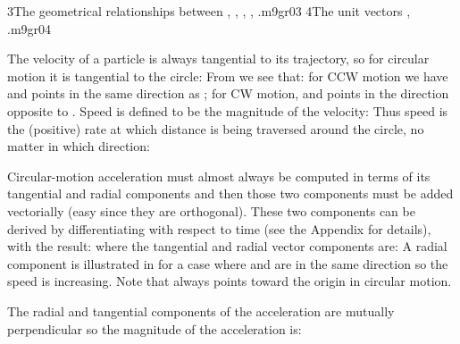 {\TwoCaptionedFramedFigures%
     {3}{The geometrical relationships between , , \m{\theta}, , .}{m9gr03}%
     {4}{The unit vectors , \m{\uvec{\theta}}.}{m9gr04}

The velocity of a particle is always tangential to its trajectory, so for
circular motion it is tangential to the circle:
%
%
From  we see that: for CCW motion we have  and
 points in the same direction as \m{\uvec{\theta}}; for CW motion,
 and  points in the direction opposite to
\m{\uvec{\theta}}.
Speed  is defined to be the magnitude of the velocity:
%
%
Thus speed is the (positive) rate at which distance is being traversed
around the circle, no matter in which direction:
%


Circular-motion acceleration must almost always be computed in terms
of its tangential and radial components and then those two components must
be added vectorially (easy since they are orthogonal).
These two components can be derived by differentiating  with
respect to time (see the Appendix for details), with the result:
%
%
where the tangential and radial vector components are:
%
%
%
 A radial component is illustrated in  for a case where 
and  are in the same direction so the speed is increasing.
Note that  always points toward the origin in circular motion.

The radial and tangential components of the acceleration are mutually
perpendicular so the magnitude of the acceleration is:
%
}%
%
